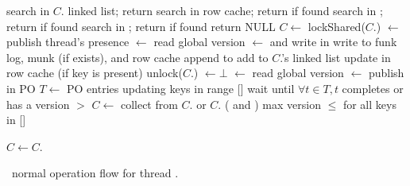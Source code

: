 \begin{algorithm}[tb]
\begin{algorithmic}[1]{}
			\State search  in $C$. linked list;  return 
		\EndIf
		\State search  in row cache; return  if found
			\State	search  in ; return  if found
		\EndIf
		\State	search  in ; return  if found
		\State return NULL	
\EndProcedure
\Statex
{}	
		\State $C \leftarrow$ 
		\State lockShared($C$.)
		\State  {}  $\leftarrow$ 
			 \Comment publish  thread's presence 
		\State {} $\leftarrow$    \Comment read global version
		\State  {}  $\leftarrow$ 
			\Comment and write in 
		\Statex \Comment write  to funk log, munk (if exists), and row cache  
		\State append  to 
			\State add   to $C$.'s linked list
		\EndIf
		\State update  in row cache (if key is present)
		\State unlock($C$.)
		\State {}  $\leftarrow \bot$ 
\EndProcedure
\Statex
{}
		\State {} $\leftarrow$    \Comment read global version
		\State  {}  $\leftarrow$ 
		\Comment publish in PO
		\State  $T \leftarrow $  PO entries updating keys in range [] 
		\State wait until $\forall t \in T, t$  completes or has a version $>$   
		\State $C \leftarrow$ 
		\Repeat
				\State collect from $C$. or $C$. ( and )
				\Statex \hspace{1cm} max version $\le$ for all keys in [] 

			\State $C \leftarrow C$. 
\EndProcedure	
\end{algorithmic}
\caption{\sys\ normal operation flow for thread .}
\label{alg:ops}
\end{algorithm}



